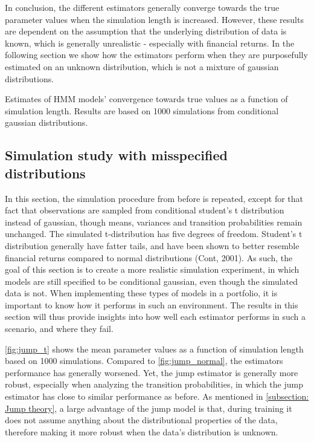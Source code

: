 In conclusion, the different estimators generally converge towards the true parameter values when the simulation length is increased. However, these results are dependent on the assumption that the underlying distribution of data is known, which is generally unrealistic - especially with financial returns. In the following section we show how the estimators perform when they are purposefully estimated on an unknown distribution, which is not a mixture of gaussian distributions.


\begin{table}[H]
\centering
\caption{Estimates of HMM models' convergence towards true values as a function of simulation length. Results are based on 1000 simulations from conditional gaussian distributions.}

\label{tab:jump_gaussian}
\end{table}


\subsection{Simulation study with misspecified distributions}

In this section, the simulation procedure from before is repeated, except for that fact that observations are sampled from conditional student's t distribution instead of gaussian, though means, variances and transition probabilities remain unchanged. The simulated t-distribution has five degrees of freedom. Student's t distribution generally have fatter tails, and have been shown to better resemble financial returns compared to normal distributions (Cont, 2001). As such, the goal of this section is to create a more realistic simulation experiment, in which models are still specified to be conditional gaussian, even though the simulated data is not. When implementing these types of models in a portfolio, it is important to know how it performs in such an environment. The results in this section will thus provide insights into how well each estimator performs in such a scenario, and where they fail.

\cref{fig:jump_t} shows the mean parameter values as a function of simulation length based on 1000 simulations. Compared to \cref{fig:jump_normal}, the estimators performance has generally worsened. Yet, the jump estimator is generally more robust, especially when analyzing the transition probabilities, in which the jump estimator has close to similar performance as before. As mentioned in \cref{subsection: Jump theory}, a large advantage of the jump model is that, during training it does not assume anything about the distributional properties of the data, therefore making it more robust when the data's distribution is unknown.

